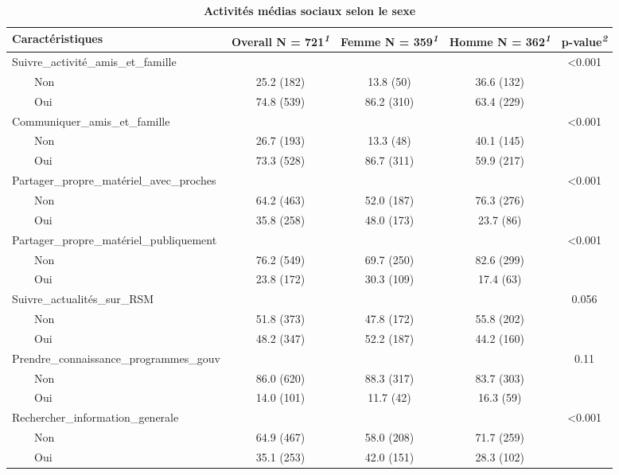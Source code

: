 \documentclass[
]{article}
\begin{document}
\newpage
\begin{table}[!t]
\caption{\label{tab:unnamed-chunk-12}\textbf{Activités médias sociaux selon le sexe}} 
\fontsize{12.0pt}{14.4pt}\selectfont
\begin{tabular*}{\linewidth}{@{\extracolsep{\fill}}lcccc}
\toprule
\textbf{Caractéristiques} & \textbf{Overall}  N = 721\textsuperscript{\textit{1}} & \textbf{Femme}  N = 359\textsuperscript{\textit{1}} & \textbf{Homme}  N = 362\textsuperscript{\textit{1}} & \textbf{p-value}\textsuperscript{\textit{2}} \\ 
\midrule\addlinespace[2.5pt]
Suivre\_activité\_amis\_et\_famille &  &  &  & <0.001 \\ 
    Non & 25.2 (182) & 13.8 (50) & 36.6 (132) &  \\ 
    Oui & 74.8 (539) & 86.2 (310) & 63.4 (229) &  \\ 
Communiquer\_amis\_et\_famille &  &  &  & <0.001 \\ 
    Non & 26.7 (193) & 13.3 (48) & 40.1 (145) &  \\ 
    Oui & 73.3 (528) & 86.7 (311) & 59.9 (217) &  \\ 
Partager\_propre\_matériel\_avec\_proches &  &  &  & <0.001 \\ 
    Non & 64.2 (463) & 52.0 (187) & 76.3 (276) &  \\ 
    Oui & 35.8 (258) & 48.0 (173) & 23.7 (86) &  \\ 
Partager\_propre\_matériel\_publiquement &  &  &  & <0.001 \\ 
    Non & 76.2 (549) & 69.7 (250) & 82.6 (299) &  \\ 
    Oui & 23.8 (172) & 30.3 (109) & 17.4 (63) &  \\ 
Suivre\_actualités\_sur\_RSM &  &  &  & 0.056 \\ 
    Non & 51.8 (373) & 47.8 (172) & 55.8 (202) &  \\ 
    Oui & 48.2 (347) & 52.2 (187) & 44.2 (160) &  \\ 
Prendre\_connaissance\_programmes\_gouv &  &  &  & 0.11 \\ 
    Non & 86.0 (620) & 88.3 (317) & 83.7 (303) &  \\ 
    Oui & 14.0 (101) & 11.7 (42) & 16.3 (59) &  \\ 
Rechercher\_information\_generale &  &  &  & <0.001 \\ 
    Non & 64.9 (467) & 58.0 (208) & 71.7 (259) &  \\ 
    Oui & 35.1 (253) & 42.0 (151) & 28.3 (102) &  \\ 

\end{tabular*}
\end{table}
\end{document}

